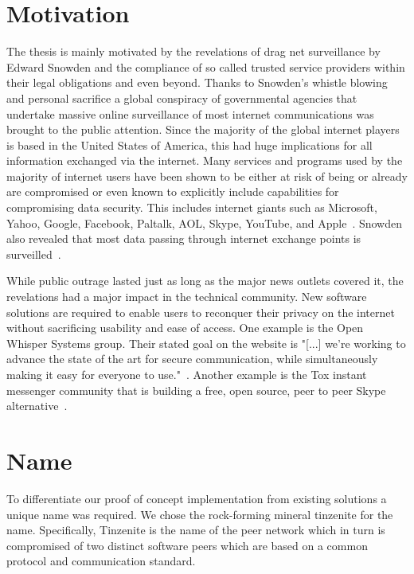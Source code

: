 \section{Motivation}
\label{sec:Motivation} %

The thesis is mainly motivated by the revelations of drag net surveillance by Edward Snowden and the compliance of so called trusted service providers within their legal obligations and even beyond.
Thanks to Snowden's whistle blowing and personal sacrifice a global conspiracy of governmental agencies that undertake massive online surveillance of most internet communications was brought to the public attention.
Since the majority of the global internet players is based in the United States of America, this had huge implications for all information exchanged via the internet.
Many services and programs used by the majority of internet users have been shown to be either at risk of being or already are compromised or even known to explicitly include capabilities for compromising data security.
This includes internet giants such as Microsoft, Yahoo, Google, Facebook, Paltalk, AOL, Skype, YouTube, and Apple~\cite{web:site:wp:internet_giants}.
Snowden also revealed that most data passing through internet exchange points is surveilled~\cite{web:site:heise:decix}.

While public outrage lasted just as long as the major news outlets covered it, the revelations had a major impact in the technical community.
New software solutions are required to enable users to reconquer their privacy on the internet without sacrificing usability and ease of access.
One example is the Open Whisper Systems group.
Their stated goal on the website is "[...] we're working to advance the state of the art for secure communication, while simultaneously making it easy for everyone to use."~\cite{web:site:whispersystems}.
Another example is the Tox instant messenger community that is building a free, open source, peer to peer Skype alternative~\cite{web:site:tox}.

\section{Name}
\label{sec:Name}

To differentiate our proof of concept implementation from existing solutions a unique name was required.
We chose the rock-forming mineral tinzenite for the name.
Specifically, Tinzenite is the name of the peer network which in turn is compromised of two distinct software peers which are based on a common protocol and communication standard.

